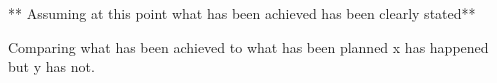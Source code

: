 ** Assuming at this point what has been achieved has been clearly stated**

Comparing what has been achieved to what has been planned x has happened but y has not.
